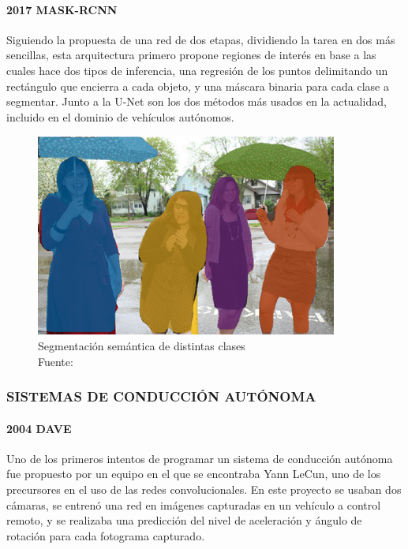 
\paragraph{2017 MASK-RCNN}
Siguiendo la propuesta de una red de dos etapas, dividiendo la tarea en dos más sencillas, esta arquitectura primero propone regiones de interés en base a las cuales hace dos tipos de inferencia, una regresión de los puntos delimitando un rectángulo que encierra a cada objeto, y una máscara binaria para cada clase a segmentar. \citep{mask-rcnn} Junto a la U-Net son los dos métodos más usados en la actualidad, incluido en el dominio de vehículos autónomos.

\begin{figure}[H]
    \centering
    \includegraphics[scale=0.5]{imagenes/maskrcnn}
    \caption[Segmentación semántica de distintas clases]{Segmentación semántica de distintas clases\\Fuente: \citep{mask-rcnn}}
\end{figure}
\subsubsection{SISTEMAS DE CONDUCCIÓN AUTÓNOMA}

\paragraph{2004 DAVE}
Uno de los primeros intentos de programar un sistema de conducción autónoma fue propuesto por un equipo en el que se encontraba Yann LeCun, uno de los precursores en el uso de las redes convolucionales. En este proyecto se usaban dos cámaras, se entrenó una red en imágenes capturadas en un vehículo a control remoto, y se realizaba una predicción del nivel de aceleración y ángulo de rotación para cada fotograma capturado. \citep{LeCun:04-dave}

